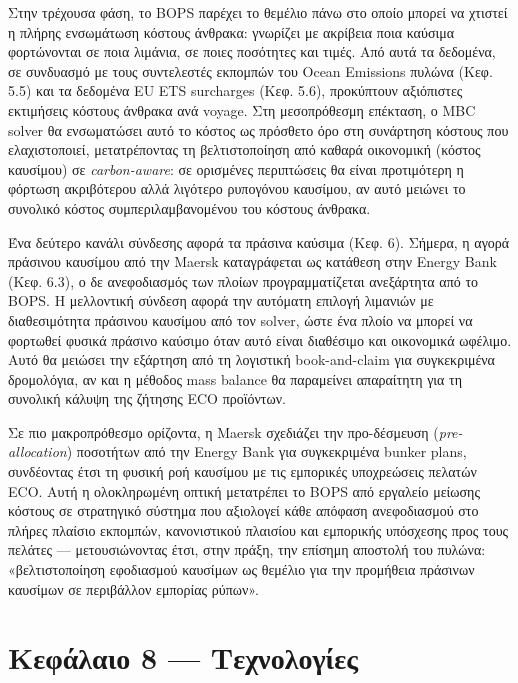 Στην τρέχουσα φάση, το BOPS παρέχει το θεμέλιο πάνω στο οποίο μπορεί να
χτιστεί η πλήρης ενσωμάτωση κόστους άνθρακα: γνωρίζει με ακρίβεια ποια
καύσιμα φορτώνονται σε ποια λιμάνια, σε ποιες ποσότητες και τιμές. Από
αυτά τα δεδομένα, σε συνδυασμό με τους συντελεστές εκπομπών του Ocean
Emissions πυλώνα (Κεφ. 5.5) και τα δεδομένα EU ETS surcharges (Κεφ.
5.6), προκύπτουν αξιόπιστες εκτιμήσεις κόστους άνθρακα ανά voyage. Στη
μεσοπρόθεσμη επέκταση, ο MBC solver θα ενσωματώσει αυτό το κόστος ως
πρόσθετο όρο στη συνάρτηση κόστους που ελαχιστοποιεί, μετατρέποντας τη
βελτιστοποίηση από καθαρά οικονομική (κόστος καυσίμου) σε
\emph{carbon-aware}: σε ορισμένες περιπτώσεις θα είναι προτιμότερη η
φόρτωση ακριβότερου αλλά λιγότερο ρυπογόνου καυσίμου, αν αυτό μειώνει το
συνολικό κόστος συμπεριλαμβανομένου του κόστους άνθρακα.

Ένα δεύτερο κανάλι σύνδεσης αφορά τα πράσινα καύσιμα (Κεφ. 6). Σήμερα, η
αγορά πράσινου καυσίμου από την Maersk καταγράφεται ως κατάθεση στην
Energy Bank (Κεφ. 6.3), ο δε ανεφοδιασμός των πλοίων προγραμματίζεται
ανεξάρτητα από το BOPS. Η μελλοντική σύνδεση αφορά την αυτόματη επιλογή
λιμανιών με διαθεσιμότητα πράσινου καυσίμου από τον solver, ώστε ένα
πλοίο να μπορεί να φορτωθεί φυσικά πράσινο καύσιμο όταν αυτό είναι
διαθέσιμο και οικονομικά ωφέλιμο. Αυτό θα μειώσει την εξάρτηση από τη
λογιστική book-and-claim για συγκεκριμένα δρομολόγια, αν και η μέθοδος
mass balance θα παραμείνει απαραίτητη για τη συνολική κάλυψη της ζήτησης
ECO προϊόντων.

Σε πιο μακροπρόθεσμο ορίζοντα, η Maersk σχεδιάζει την προ-δέσμευση
(\emph{pre-allocation}) ποσοτήτων από την Energy Bank για συγκεκριμένα
bunker plans, συνδέοντας έτσι τη φυσική ροή καυσίμου με τις εμπορικές
υποχρεώσεις πελατών ECO. Αυτή η ολοκληρωμένη οπτική μετατρέπει το BOPS
από εργαλείο μείωσης κόστους σε στρατηγικό σύστημα που αξιολογεί κάθε
απόφαση ανεφοδιασμού στο πλήρες πλαίσιο εκπομπών, κανονιστικού πλαισίου
και εμπορικής υπόσχεσης προς τους πελάτες --- μετουσιώνοντας έτσι, στην
πράξη, την επίσημη αποστολή του πυλώνα: «βελτιστοποίηση εφοδιασμού
καυσίμων ως θεμέλιο για την προμήθεια πράσινων καυσίμων σε περιβάλλον
εμπορίας ρύπων».

\pagebreak

\chapter{Κεφάλαιο 8 ---
Τεχνολογίες}\label{ux3baux3b5ux3c6ux3acux3bbux3b1ux3b9ux3bf-8-ux3c4ux3b5ux3c7ux3bdux3bfux3bbux3bfux3b3ux3afux3b5ux3c2}

